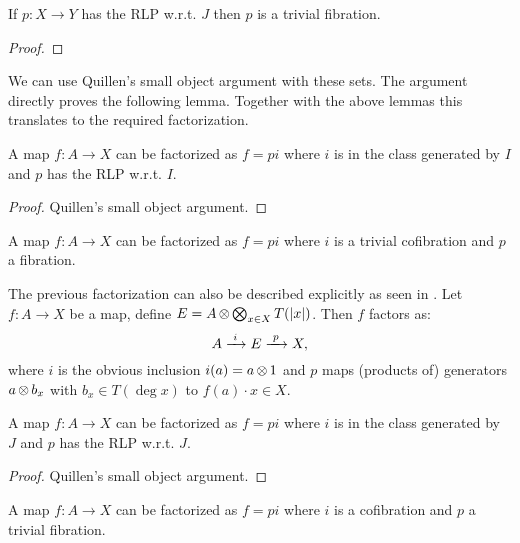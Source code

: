 \begin{lemma}
	If $p: X \to Y$ has the RLP w.r.t. $J$ then $p$ is a trivial fibration.
\end{lemma}
\begin{proof}
\end{proof}

We can use Quillen's small object argument with these sets. The argument directly proves the following lemma. Together with the above lemmas this translates to the required factorization.

\begin{lemma}
	A map $f: A \to X$ can be factorized as $f = pi$ where $i$ is in the class generated by $I$ and $p$ has the RLP w.r.t. $I$.
\end{lemma}
\begin{proof}
	Quillen's small object argument. 
\end{proof}

\begin{corollary}
	[MC5a] A map $f: A \to X$ can be factorized as $f = pi$ where $i$ is a trivial cofibration and $p$ a fibration.
\end{corollary}

The previous factorization can also be described explicitly as seen in \cite{bousfield}. Let $f: A \to X$ be a map, define $E = A \operatorname*{\otimes} \operatorname*{\bigotimes}_{x \in X}T({|{x}|})$. Then $f$ factors as:
$$ A \xrightarrow{\,\,{i}\,\,} E \xrightarrow{\,\,{p}\,\,} X, $$
where $i$ is the obvious inclusion $i(a) = a \operatorname*{\otimes} 1$ and $p$ maps (products of) generators $a \operatorname*{\otimes} b_x$ with $b_x \in T(\deg{x})$ to $f(a) \cdot x \in X$.

\begin{lemma}
	A map $f: A \to X$ can be factorized as $f = pi$ where $i$ is in the class generated by $J$ and $p$ has the RLP w.r.t. $J$.
\end{lemma}
\begin{proof}
	Quillen's small object argument.
\end{proof}

\begin{corollary}
	[MC5b] A map $f: A \to X$ can be factorized as $f = pi$ where $i$ is a cofibration and $p$ a trivial fibration.
\end{corollary}

